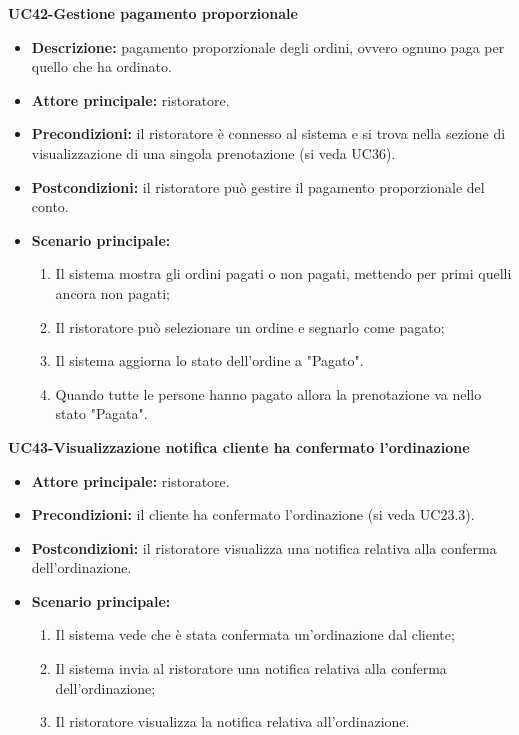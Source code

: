 \textbf{UC42-Gestione pagamento proporzionale}  
\begin{itemize}
    \item \textbf{Descrizione:} pagamento proporzionale degli ordini, ovvero ognuno paga per quello che ha ordinato.
    \item \textbf{Attore principale:} ristoratore.
    \item \textbf{Precondizioni:} il ristoratore è connesso al sistema e si trova nella sezione di visualizzazione di una singola prenotazione (si veda UC36).
    \item \textbf{Postcondizioni:} il ristoratore può gestire il pagamento proporzionale del conto.
    \item \textbf{Scenario principale:}
    \begin{enumerate}
        \item Il sistema mostra gli ordini pagati o non pagati, mettendo per primi quelli ancora non pagati;
        \item Il ristoratore può selezionare un ordine e segnarlo come pagato;
        \item Il sistema aggiorna lo stato dell'ordine a "Pagato".
        \item Quando tutte le persone hanno pagato allora la prenotazione va nello stato "Pagata".

    \end{enumerate}
\end{itemize}

\textbf{UC43-Visualizzazione notifica cliente ha confermato l'ordinazione}
\begin{itemize}
\item \textbf{Attore principale:} ristoratore.
\item \textbf{Precondizioni:} il cliente ha confermato l'ordinazione (si veda UC23.3).
\item \textbf{Postcondizioni:} il ristoratore visualizza una notifica relativa alla conferma dell'ordinazione.
\item \textbf{Scenario principale:}
\begin{enumerate}
    \item Il sistema vede che è stata confermata un'ordinazione dal cliente;
    \item Il sistema invia al ristoratore una notifica relativa alla conferma dell'ordinazione;
    \item Il ristoratore visualizza la notifica relativa all'ordinazione.
\end{enumerate}
\end{itemize}

